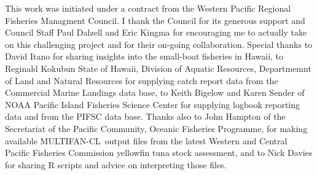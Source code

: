\documentclass[12pt,letterpaper]{article}
\newcommand\singlespacing{\baselineskip=1.0\normalbaselineskip}
\newcommand\MFCL{MULTIFAN-CL}
\begin{document}

\clearpage
\singlespacing
{}
This work was initiated under a contract from the Western Pacific Regional Fisheries
Managment Council. I thank the Council for its generous support and
Council Staff Paul Dalzell and Eric Kingma for encouraging me to
actually take on this challenging project and for their on-going
collaboration. Special thanks
to David Itano for sharing insights into the small-boat fisheries in Hawaii,
to Reginald Kokubun State of Hawaii, Division of Aquatic Resources,
Departmemnt of Land and Natural Resources for supplying catch report
data from the Commercial Marine Landings data base,
to Keith Bigelow and Karen Sender of NOAA Pacific
Island Fisheries Science Center for supplying logbook reporting data and
from the PIFSC data base.
Thanks also to John Hampton of the Secretariat of the Pacific
Community, Oceanic Fisheries Programme, for making available \MFCL\
output files from the latest Western and Central Pacific
Fisheries Commission yellowfin tuna stock assessment, and to Nick
Davies for sharing R scripts and advice on interpreting those files.
\end{document}
